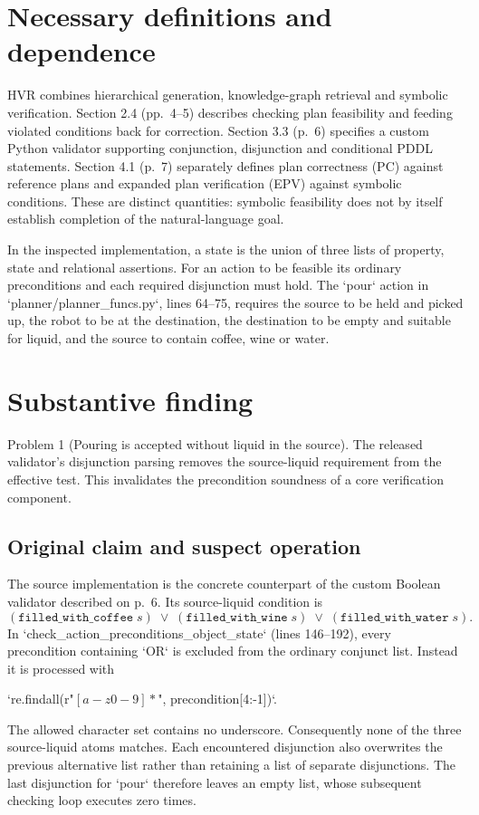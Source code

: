\documentclass[10pt]{article}
\begin{document}
\section*{Necessary definitions and dependence}
HVR combines hierarchical generation, knowledge-graph retrieval and symbolic verification. Section 2.4 (pp. 4–5) describes checking plan feasibility and feeding violated conditions back for correction. Section 3.3 (p. 6) specifies a custom Python validator supporting conjunction, disjunction and conditional PDDL statements. Section 4.1 (p. 7) separately defines plan correctness (PC) against reference plans and expanded plan verification (EPV) against symbolic conditions. These are distinct quantities: symbolic feasibility does not by itself establish completion of the natural-language goal.\par
In the inspected implementation, a state is the union of three lists of property, state and relational assertions. For an action to be feasible its ordinary preconditions and each required disjunction must hold. The `pour` action in `planner/planner\_funcs.py`, lines 64–75, requires the source to be held and picked up, the robot to be at the destination, the destination to be empty and suitable for liquid, and the source to contain coffee, wine or water.\par
\section*{Substantive finding}
Problem 1 (Pouring is accepted without liquid in the source).  The released validator’s disjunction parsing removes the source-liquid requirement from the effective test. This invalidates the precondition soundness of a core verification component.\par
\subsection*{Original claim and suspect operation}
The source implementation is the concrete counterpart of the custom Boolean validator described on p. 6. Its source-liquid condition is \[(\texttt{filled\_with\_coffee}\;s)
\;\lor\;(\texttt{filled\_with\_wine}\;s)
\;\lor\;(\texttt{filled\_with\_water}\;s).\] In `check\_action\_preconditions\_object\_state` (lines 146–192), every precondition containing `OR` is excluded from the ordinary conjunct list. Instead it is processed with\par
`re.findall(r"\([a-z0-9 ]*\)", precondition[4:-1])`.\par
The allowed character set contains no underscore. Consequently none of the three source-liquid atoms matches. Each encountered disjunction also overwrites the previous alternative list rather than retaining a list of separate disjunctions. The last disjunction for `pour` therefore leaves an empty list, whose subsequent checking loop executes zero times.\par
\end{document}
